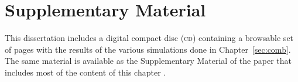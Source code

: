 \chapter{Supplementary Material}
\label{sec:supplmat}
\setstretch{\lspac}

This dissertation includes a digital compact disc (\textsc{cd}) containing a browsable set of pages with the results of the various simulations done in Chapter~\ref{sec:comb}. The same material is available as the Supplementary Material of the paper that includes most of the content of this chapter \citep{Winkler2016}.